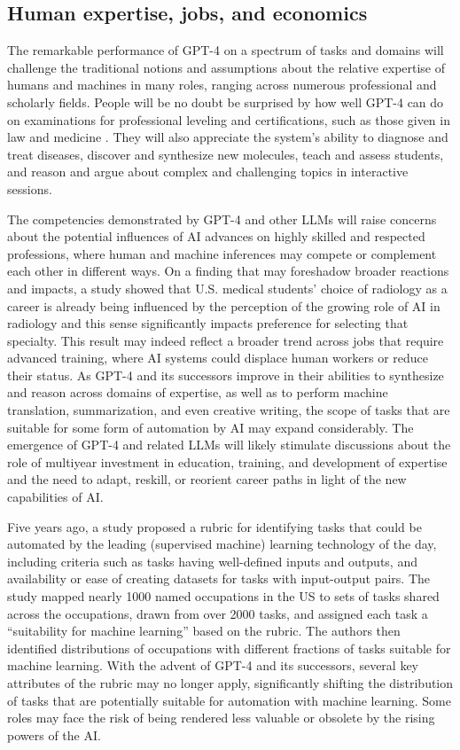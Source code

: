 \subsection {Human expertise, jobs, and economics} 

The remarkable performance of {GPT-4} on a spectrum of tasks and domains will challenge the traditional notions and assumptions about the relative expertise of humans and machines in many roles, ranging across numerous professional and scholarly fields. People will be no doubt be surprised by how well {GPT-4} can do on examinations for professional leveling and certifications, such as those given in law and medicine \cite{Nori2023etal}. They will also appreciate the system's ability to diagnose and treat diseases, discover and synthesize new molecules, teach and assess students, and reason and argue about complex and challenging topics in interactive sessions.

The competencies demonstrated by {GPT-4} and other LLMs will raise concerns about the potential influences of AI advances on highly skilled and respected professions, where human and machine inferences may compete or complement each other in different ways. On a finding that may foreshadow broader reactions and impacts, a study \cite{Reeder2022} showed that U.S. medical students' choice of radiology as a career is already being influenced by the perception of the growing role of AI in radiology and this sense significantly impacts preference for selecting that specialty. This result may indeed reflect a broader trend across jobs that require advanced training, where AI systems could displace human workers or reduce their status. As {GPT-4} and its successors improve in their abilities to synthesize and reason across domains of expertise, as well as to perform machine translation, summarization, and even creative writing, the scope of tasks that are suitable for some form of automation by AI may expand considerably.  The emergence of {GPT-4} and related LLMs will likely stimulate discussions about the role of multiyear investment in education, training, and development of expertise and the need to adapt, reskill, or reorient career paths in light of the new capabilities of AI. 

Five years ago, a study \cite{brynjolfsson2017} proposed a rubric for identifying tasks that could be automated by the leading (supervised machine) learning technology of the day, including criteria such as tasks having well-defined inputs and outputs, and availability or ease of creating datasets for tasks with input-output pairs. The study mapped nearly 1000 named occupations in the US to sets of tasks shared across the occupations, drawn from over 2000 tasks, and assigned each task a ``suitability for machine learning'' based on the rubric. The authors then identified distributions of occupations with different fractions of tasks suitable for machine learning. With the advent of {GPT-4} and its successors, several key attributes of the rubric may no longer apply, significantly shifting the distribution of tasks that are potentially suitable for automation with machine learning. Some roles may face the risk of being rendered less valuable or obsolete by the rising powers of the AI. 


